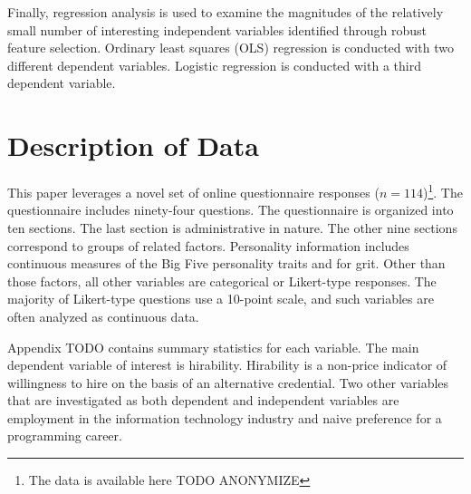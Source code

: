 \documentclass[review]{elsarticle}
\begin{document}
Finally, regression analysis is used to examine the magnitudes of the relatively small
number of interesting independent variables identified through robust feature selection.
Ordinary least squares (OLS) regression is conducted with two different dependent variables.
Logistic regression is conducted with a third dependent variable.


\section{Description of Data}

This paper leverages a novel set of online questionnaire responses ($n = 114$)\footnote{
    The data is available here TODO ANONYMIZE
}.
The questionnaire includes ninety-four questions.
The questionnaire is organized into ten sections.
The last section is administrative in nature.
The other nine sections correspond to groups of related factors.
Personality information includes continuous measures of the Big Five personality traits and for grit.
Other than those factors, all other variables are categorical or Likert-type responses.
The majority of Likert-type questions use a 10-point scale, and such variables are often analyzed as continuous data.

Appendix TODO contains summary statistics for each variable.
The main dependent variable of interest is hirability.
Hirability is a non-price indicator of willingness to hire on the basis of an alternative credential.
Two other variables that are investigated as both dependent and independent variables are
employment in the information technology industry
and naive preference for a programming career.
\end{document}
